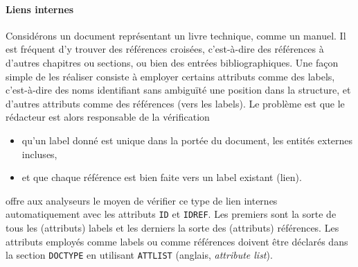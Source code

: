\paragraph{Liens internes}

Considérons un document représentant un livre technique, comme un
manuel. Il est fréquent d'y trouver des références croisées,
c'est-à-dire des références à d'autres chapitres ou sections, ou bien
des entrées bibliographiques. Une façon simple de les réaliser
consiste à employer certains attributs comme des labels, c'est-à-dire
des noms identifiant sans ambiguïté une position dans la structure, et
d'autres attributs comme des références (vers les labels). Le problème
est que le rédacteur est alors responsable de la vérification
\begin{itemize}

  \item qu'un label donné est unique dans la portée du document, les
    entités externes incluses,

  \item et que chaque référence est bien faite vers un label existant
    (lien).

\end{itemize}
\label{xml_intro_ATTLIST}
\XML offre aux analyseurs le moyen de vérifier ce type de lien
internes automatiquement avec les attributs \texttt{ID} et
\texttt{IDREF}. Les premiers sont la sorte de tous les (attributs)
labels et les derniers la sorte des (attributs) références. Les
attributs employés comme labels ou comme références doivent être
déclarés dans la section \texttt{DOCTYPE} en utilisant
\texttt{ATTLIST} (anglais, \emph{attribute list}).

